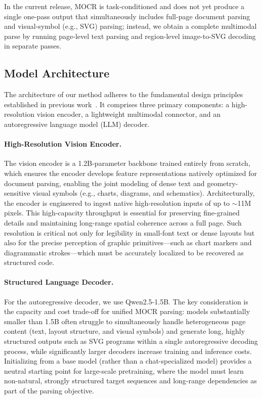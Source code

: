 \documentclass{article}
\begin{document}
    In the current release, MOCR is task-conditioned and does not yet produce a single one-pass output that simultaneously includes full-page document parsing and visual-symbol (e.g., SVG) parsing; instead, we obtain a complete multimodal parse by running page-level text parsing and region-level image-to-SVG decoding in separate passes.
     
\subsection{Model Architecture}
\label{sec:model_architecture}
The architecture of our method adheres to the fundamental design principles established in previous work~\cite{li2025dots}. It comprises three primary components: a high-resolution vision encoder, a lightweight multimodal connector, and an autoregressive language model (LLM) decoder.

\paragraph{High-Resolution Vision Encoder.}
    The vision encoder is a 1.2B-parameter backbone trained entirely from scratch, which ensures the encoder develops feature representations natively optimized for document parsing, enabling the joint modeling of dense text and geometry-sensitive visual symbols (e.g., charts, diagrams, and schematics). Architecturally, the encoder is engineered to ingest native high-resolution inputs of up to $\sim$11M pixels. This high-capacity throughput is essential for preserving fine-grained details and maintaining long-range spatial coherence across a full page. Such resolution is critical not only for legibility in small-font text or dense layouts but also for the precise perception of graphic primitives—such as chart markers and diagrammatic strokes—which must be accurately localized to be recovered as structured code.

\paragraph{Structured Language Decoder.}
    For the autoregressive decoder, we use Qwen2.5-1.5B. The key consideration is the capacity and cost trade-off for unified MOCR parsing: models substantially smaller than 1.5B often struggle to simultaneously handle heterogeneous page content (text, layout structure, and visual symbols) and generate long, highly structured outputs such as SVG programs within a single autoregressive decoding process, while significantly larger decoders increase training and inference costs. Initializing from a base model (rather than a chat-specialized model) provides a neutral starting point for large-scale pretraining, where the model must learn non-natural, strongly structured target sequences and long-range dependencies as part of the parsing objective.
\end{document}
